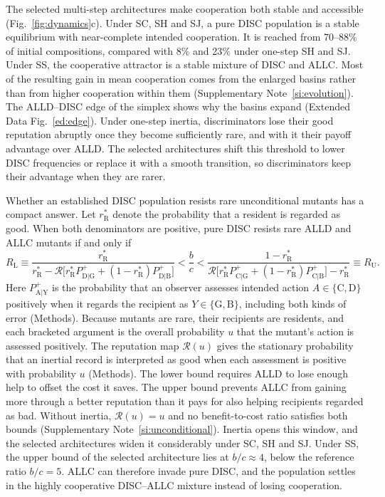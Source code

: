 \documentclass[fleqn,10pt]{wlscirep}
\newcommand{\Rmap}{\mathscr{R}}            %
\newcommand{\st}[1]{\mathrm{#1}}           %
\newcommand{\Pp}[1]{P^{+}_{\mathrm{#1}}}   %
\newcommand{\rR}{r_{\mathrm{R}}^{*}}
\theoremstyle{plain}
\begin{document}
The selected multi-step architectures make cooperation both stable and accessible (Fig.~\ref{fig:dynamics}c). Under SC, SH and SJ, a pure DISC population is a stable equilibrium with near-complete intended cooperation. It is reached from 70--88\% of initial compositions, compared with 8\% and 23\% under one-step SH and SJ. Under SS, the cooperative attractor is a stable mixture of DISC and ALLC. Most of the resulting gain in mean cooperation comes from the enlarged basins rather than from higher cooperation within them (Supplementary Note~\ref{si:evolution}). The ALLD--DISC edge of the simplex shows why the basins expand (Extended Data Fig.~\ref{ed:edge}). Under one-step inertia, discriminators lose their good reputation abruptly once they become sufficiently rare, and with it their payoff advantage over ALLD. The selected architectures shift this threshold to lower DISC frequencies or replace it with a smooth transition, so discriminators keep their advantage when they are rarer.

Whether an established DISC population resists rare unconditional mutants has a compact answer. Let $\rR$ denote the probability that a resident is regarded as good. When both denominators are positive, pure DISC resists rare ALLD and ALLC mutants if and only if
\begin{equation}
R_{\mathrm L}\equiv
\frac{\rR}{\rR-\Rmap\bigl[\rR\Pp{D|G}+(1-\rR)\Pp{D|B}\bigr]}
<\frac{b}{c}<
\frac{1-\rR}{\Rmap\bigl[\rR\Pp{C|G}+(1-\rR)\Pp{C|B}\bigr]-\rR}
\equiv R_{\mathrm U}.
\label{eq:window}
\end{equation}
Here $\Pp{A|Y}$ is the probability that an observer assesses intended action $A\in\{\st C,\st D\}$ positively when it regards the recipient as $Y\in\{\st G,\st B\}$, including both kinds of error (Methods). Because mutants are rare, their recipients are residents, and each bracketed argument is the overall probability $u$ that the mutant's action is assessed positively. The reputation map $\Rmap(u)$ gives the stationary probability that an inertial record is interpreted as good when each assessment is positive with probability $u$ (Methods). The lower bound requires ALLD to lose enough help to offset the cost it saves. The upper bound prevents ALLC from gaining more through a better reputation than it pays for also helping recipients regarded as bad. Without inertia, $\Rmap(u)=u$ and no benefit-to-cost ratio satisfies both bounds (Supplementary Note~\ref{si:unconditional}). Inertia opens this window, and the selected architectures widen it considerably under SC, SH and SJ. Under SS, the upper bound of the selected architecture lies at $b/c\approx4$, below the reference ratio $b/c=5$. ALLC can therefore invade pure DISC, and the population settles in the highly cooperative DISC--ALLC mixture instead of losing cooperation.
\end{document}
